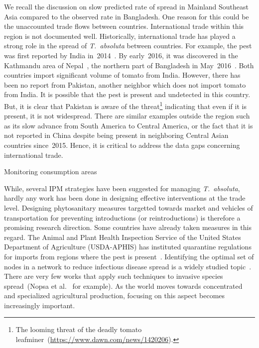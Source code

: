 \documentclass[11pt]{article}
\newcommand{\tuta}{\emph{T.~absoluta}}
\theoremstyle{definition}
\begin{document}
We recall the discussion on slow predicted rate of spread in Mainland
Southeast Asia compared to the observed rate in Bangladesh. One reason for
this could be the unaccounted trade flows between countries. International
trade within this region is not documented well. Historically,
international trade has played a strong role in the spread of \tuta{}
between countries. For example, the pest was first reported by India
in~2014~\cite{sridhar2014new,kalleshwaraswamy2015occurrence}. By
early~2016, it was discovered in the Kathmandu area of
Nepal~\cite{bajracharya2016first}, the northern part of Bangladesh in
May~2016~\cite{hossain2016first}. Both countries import significant volume
of tomato from India. However, there has been no report from Pakistan,
another neighbor which does not import tomato from India. It is possible
that the pest is present and undetected in this country. But, it is clear
that Pakistan is aware of the threat\footnote{The looming threat of the
deadly tomato leafminer~(\url{https://www.dawn.com/news/1420206}).}
indicating that even if it is present, it is not widespread. There are
similar examples outside the region such as its slow advance from South
America to Central America, or the fact that it is not reported in China
despite being present in neighboring Central Asian countries since~2015.
Hence, it is critical to address the data gaps concerning international
trade.

Monitoring consumption areas

While, several IPM strategies have been suggested for managing \tuta{},
hardly any work has been done in designing effective interventions at the
trade level. Designing phytosanitary measures targetted towards market and
vehicles of transportation for preventing introductions (or
reintroductions) is therefore a promising research direction. Some
countries have already taken measures in this regard. The Animal and Plant
Health Inspection Service of the United States Department of Agriculture
(USDA-APHIS) has instituted quarantine regulations for imports from regions
where the pest is present~\cite{USDA2012}. Identifying the optimal set of
nodes in a network to reduce infectious disease spread is a widely studied
topic~\cite{madar2004immunization}. There are very few works that apply
such techniques to invasive species spread~(Nopsa et
al.~\cite{nopsa2015ecological} for example). As the world moves towards
concentrated and specialized agricultural production, focusing on this
aspect becomes increasingly important.
\end{document}
